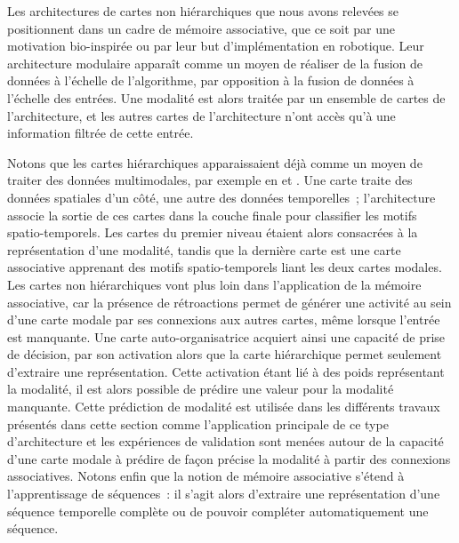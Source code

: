 \documentclass[../main]{subfiles}
\begin{document}
Les architectures de cartes non hiérarchiques que nous avons relevées se positionnent dans un cadre de mémoire associative, que ce soit par une motivation bio-inspirée ou par leur but d'implémentation en robotique.
Leur architecture modulaire apparaît comme un moyen de réaliser de la fusion de données à l'échelle de l'algorithme, par opposition à la fusion de données à l'échelle des entrées. 
Une modalité est alors traitée par un ensemble de cartes de l'architecture, et les autres cartes de l'architecture n'ont accès qu'à une information filtrée de cette entrée. 


Notons que les cartes hiérarchiques apparaissaient déjà comme un moyen de traiter des données multimodales, par exemple en \cite{mici_self-organizing_2018} et \cite{nawaratne_hierarchical_2020-1}. 
Une carte traite des données spatiales d'un côté, une autre des données temporelles~; l'architecture associe la sortie de ces cartes dans la couche finale pour classifier les motifs spatio-temporels. Les cartes du premier niveau étaient alors consacrées à la représentation d'une modalité, tandis que la dernière carte est une carte associative apprenant des motifs spatio-temporels liant les deux cartes modales.
Les cartes non hiérarchiques vont plus loin dans l'application de la mémoire associative, car la présence de rétroactions permet de générer une activité au sein d'une carte modale par ses connexions aux autres cartes, même lorsque l'entrée est manquante.
Une carte auto-organisatrice acquiert ainsi une capacité de prise de décision, par son activation alors que la carte hiérarchique permet seulement d'extraire une représentation.
Cette activation étant lié à des poids représentant la modalité, il est alors possible de prédire une valeur pour la modalité manquante. 
Cette prédiction de modalité est utilisée dans les différents travaux présentés dans cette section comme l'application principale de ce type d'architecture et les expériences de validation sont menées autour de la capacité d'une carte modale à prédire de façon précise la modalité à partir des connexions associatives.
Notons enfin que la notion de mémoire associative s'étend à l'apprentissage de séquences~: il s'agit alors d'extraire une représentation d'une séquence temporelle complète ou de pouvoir compléter automatiquement une séquence.
\end{document}
